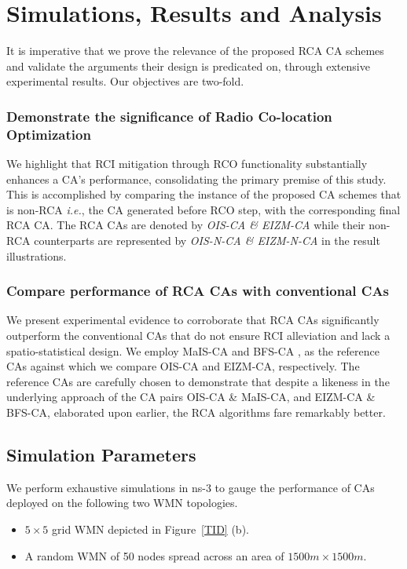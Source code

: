 \documentclass[conference]{IEEEtran}
\begin{document}
\section{Simulations, Results and Analysis}
It is imperative that we prove the relevance of the proposed RCA CA schemes and validate the arguments their design is predicated on, through extensive experimental results. Our objectives are two-fold. 
\subsubsection{Demonstrate the significance of Radio Co-location Optimization} We highlight that RCI mitigation through RCO functionality substantially enhances a CA's performance, consolidating the primary premise of this study. This is accomplished by comparing the instance of the proposed CA schemes that is non-RCA \emph{i.e.}, the CA generated before RCO step, with the corresponding final RCA CA. The RCA CAs are denoted by \textit{OIS-CA \& EIZM-CA} while their non-RCA counterparts are represented by \textit{OIS-N-CA \& EIZM-N-CA} in the result illustrations. 
\subsubsection{Compare performance of RCA CAs with conventional CAs} We present experimental evidence to corroborate that RCA CAs significantly outperform the conventional CAs that do not ensure RCI alleviation and lack a spatio-statistical design. We employ MaIS-CA \cite{24Aizaz} and BFS-CA \cite{22Ramachandran}, as the reference CAs against which we compare OIS-CA and EIZM-CA, respectively. The reference CAs are carefully chosen to demonstrate that despite a likeness in the underlying approach of the CA pairs OIS-CA \& MaIS-CA, and EIZM-CA \& BFS-CA, elaborated upon earlier, the RCA algorithms fare remarkably better.




\subsection{Simulation Parameters}

We perform exhaustive simulations in ns-3 \cite{NS-3} to gauge the performance of CAs deployed on the following two WMN topologies.
\begin{itemize}
 \item $5\times5$ grid WMN depicted in Figure~\ref{TID} (b).
 \item A random WMN of 50 nodes spread across an area of $1500m \times 1500m$.
\end{itemize}
\end{document}
